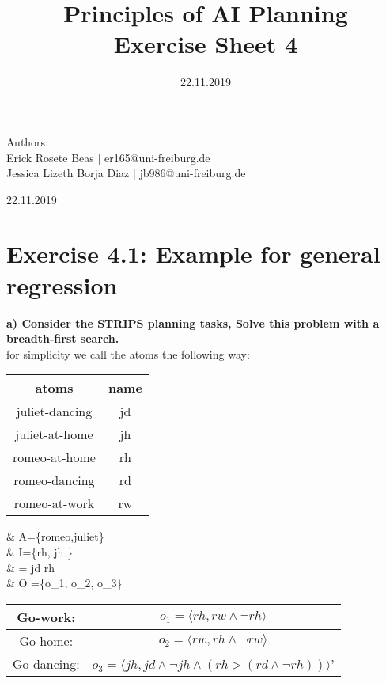\documentclass[12pt,a4paper]{article}
\title{\textbf{Principles of AI Planning
		\\{\Large Exercise Sheet 4}}}
\date{22.11.2019}
\begin{document}
	\begin{flushleft}
		Authors:\\
		Erick Rosete Beas | er165@uni-freiburg.de\\
		Jessica Lizeth Borja Diaz | jb986@uni-freiburg.de\\
	\end{flushleft}
	{\let\newpage\relax\maketitle}
	\begin{center} 
		\large 22.11.2019 
	\end{center}

\hfill\break
\section*{Exercise 4.1: Example for general regression}
	\textbf{a) Consider the STRIPS planning tasks, Solve this problem with a breadth-first search.}
	\\for simplicity we call the atoms the following way:

\begin{multicols}{2}
	\begin{center}
		\begin{tabular}{ c|c }
		atoms & name \\
		\hline
		juliet-dancing & jd \\
		juliet-at-home & jh \\    
		romeo-at-home & rh \\   
		romeo-dancing & rd \\
		romeo-at-work & rw \\ 
		\end{tabular}
	\end{center}

	\begin{flalign*}
	 	 & A=\{romeo,juliet\}
		\\ & I=\{rh, jh  \}
		\\ & \gamma = jd \land rh
		\\ & O =\{o_1, o_2, o_3\}
	\end{flalign*} 
\end{multicols}{}

\hfill\break
\begin{center}
	\begin{tabular}{ c | c }
	 	Go-work: &
		$ o_1= \langle rh, rw \land \neg rh \rangle $ \\[1em]
		\hline
		Go-home: &
		$ o_2= \langle rw, rh \land \neg rw \rangle $ \\[1em]
		\hline
		Go-dancing: &
		$ o_3= \langle jh, jd \land \neg jh \land 
				(rh \triangleright (rd \land \neg rh) )\rangle $'
	\end{tabular}{}
\end{center}
\end{document}
